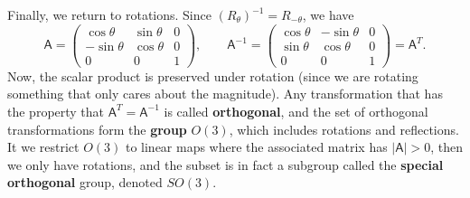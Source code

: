 \documentclass[letter-paper]{tufte-book}
\newcommand\Def[1]{\textbf{#1}}
\begin{document}
Finally, we return to rotations. Since $(R_\theta)^{-1}=R_{-\theta}$, we have
\begin{equation*}
	\mathsf{A}=\begin{pmatrix}\cos\theta&\sin\theta&0\\
	-\sin\theta&\cos\theta&0\\0&0&1\end{pmatrix},\qquad
	\mathsf{A}^{-1}=\begin{pmatrix}\cos\theta&-\sin\theta&0\\
	\sin\theta&\cos\theta&0\\0&0&1\end{pmatrix}=\mathsf{A}^{T}.
\end{equation*}
Now, the scalar product is preserved under rotation (since we are rotating
something that only cares about the magnitude). Any transformation that has the
property that $\mathsf{A}^{T}=\mathsf{A}^{-1}$ is called \Def{orthogonal},
and the set of orthogonal transformations form the \Def{group} $O(3)$,
which includes rotations and reflections. It we restrict $O(3)$ to linear maps
where the associated matrix has $|\mathsf{A}|>0$, then we only have rotations,
and the subset is in fact a subgroup called the \Def{special orthogonal}
group, denoted $SO(3)$.








\mainmatter




%


\end{document}
